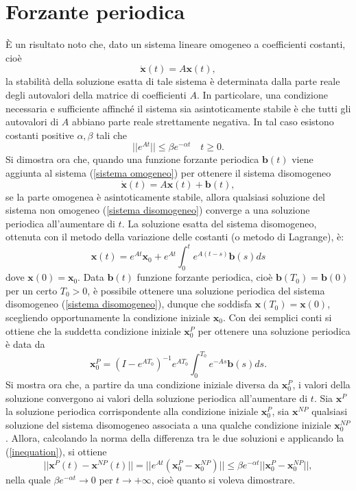 \section{Forzante periodica}
È un risultato noto che, dato un sistema lineare omogeneo a coefficienti costanti, cioè
\begin{equation}\label{sistema omogeneo}
    \bm{\dot{x}}(t)=A\bm{x}(t),
\end{equation}
la stabilità della soluzione esatta di tale sistema è determinata dalla parte reale degli autovalori della matrice di coefficienti $A$. In particolare, una condizione necessaria e sufficiente affinché il sistema sia asintoticamente stabile è che tutti gli autovalori di $A$ abbiano parte reale strettamente negativa. In tal caso esistono costanti positive $\alpha, \beta$ tali che
\begin{equation}\label{inequation}
||e^{At}||\leq \beta e^{-\alpha t}\quad t\geq 0.    
\end{equation}
Si dimostra ora che, quando una funzione forzante periodica $\bm{b}(t)$ viene aggiunta al sistema (\ref{sistema omogeneo}) per ottenere il
sistema disomogeneo 
\begin{equation}\label{sistema disomogeneo}
    \bm{\dot{x}}(t)=A\bm{x}(t)+\bm{b}(t),
\end{equation}
se la parte omogenea è asintoticamente stabile, allora qualsiasi soluzione del sistema non omogeneo (\ref{sistema disomogeneo}) converge a una soluzione periodica all'aumentare di $t$. La soluzione esatta del sistema disomogeneo, ottenuta con il metodo della variazione delle costanti (o metodo di Lagrange), è:
\[
\bm{x}(t)=e^{At}\bm{x}_0+e^{At}\int_0^t e^{A(t-s)}\bm{b}(s)ds
\]
dove $\bm{x}(0)=\bm{x}_0$. Data $\bm{b}(t)$ funzione forzante periodica, cioè $\bm{b}(T_0) = \bm{b}(0)$ per un certo $T_0 > 0$, è possibile ottenere una soluzione periodica del sistema disomogeneo (\ref{sistema disomogeneo}), dunque che soddisfa $\bm{x}(T_0) = \bm{x}(0)$, scegliendo opportunamente la condizione iniziale $\bm{x}_0$. Con dei semplici conti si ottiene che la suddetta condizione iniziale $\bm{x}^P_0$ per ottenere una soluzione periodica è data da
\[
\bm{x}_0^P=(I-e^{AT_0})^{-1} e^{AT_0}\int_0^{T_0} e^{-As}\bm{b}(s)ds.
\]
Si mostra ora che, a partire da una condizione iniziale diversa da $\bm{x}^P_0$, i valori della soluzione convergono ai valori della soluzione periodica all'aumentare di $t$. Sia $\bm{x}^P$ la soluzione periodica corrispondente alla condizione iniziale $\bm{x}^P_0$, sia  $\bm{x}^{NP}$ qualsiasi soluzione del sistema disomogeneo associata a una qualche condizione iniziale $\bm{x}_0^{NP}$. Allora, calcolando la norma della differenza tra le due soluzioni e applicando la (\ref{inequation}), si ottiene
\[
||\bm{x}^P(t)-\bm{x}^{NP}(t)||=||e^{At}(\bm{x}_0^P-\bm{x}_0^{NP})||\leq \beta e^{-\alpha t} ||\bm{x}_0^P-\bm{x}_0^{NP}||,
\]
nella quale $\beta e^{-\alpha t}\rightarrow 0$ per $t\rightarrow +\infty$, cioè quanto si voleva dimostrare. 

